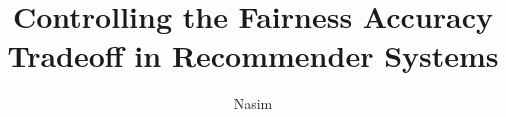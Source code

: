 \documentclass[defaultstyle,11pt,inlineh4]{thesis}
\title{Controlling the Fairness Accuracy Tradeoff in Recommender Systems}
\author{Nasim}{Sonboli}
\begin{document}









\nocite{*}		%

\appendix


\end{document}
